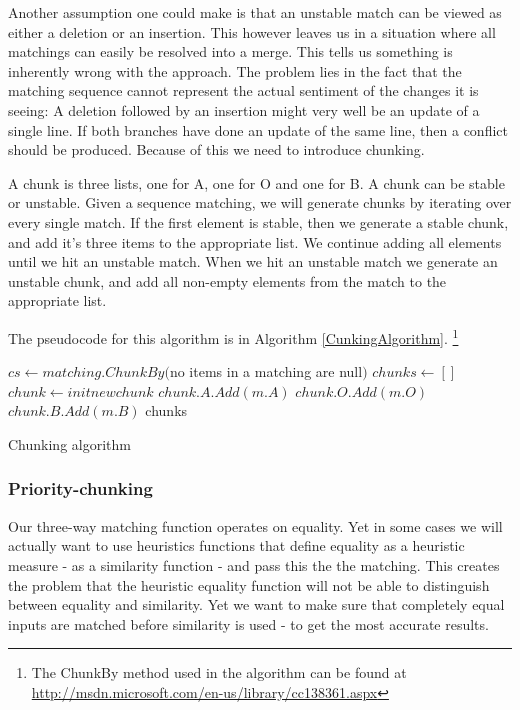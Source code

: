 \documentclass[11pt]{article}
\begin{document}
Another assumption one could make is that an unstable match can be viewed as either a deletion or an insertion. This however leaves us in a situation where all matchings can easily be resolved into a merge. This tells us something is inherently wrong with the approach. The problem lies in the fact that the matching sequence cannot represent the actual sentiment of the changes it is seeing: A deletion followed by an insertion might very well be an update of a single line. If both branches have done an update of the same line, then a conflict should be produced. Because of this we need to introduce chunking.

A chunk is three lists, one for A, one for O and one for B. A chunk can be stable or unstable. Given a sequence matching, we will generate chunks by iterating over every single match. If the first element is stable, then we generate a stable chunk, and add it's three items to the appropriate list. We continue adding all elements until we hit an unstable match. When we hit an unstable match we generate an unstable chunk, and add all non-empty elements from the match to the appropriate list.

The pseudocode for this algorithm is in Algorithm \ref{CunkingAlgorithm}. \footnote{The ChunkBy method used in the algorithm can be found at \url{http://msdn.microsoft.com/en-us/library/cc138361.aspx}}


\begin{algorithm}
\begin{algorithmic}
	\State $cs \gets matching.ChunkBy($no items in a matching are null$)$
	\State $chunks \gets []$
		\State $chunk \gets init new chunk$
				\State $chunk.A.Add(m.A)$
			\EndIf
				\State $chunk.O.Add(m.O)$
			\EndIf
				\State $chunk.B.Add(m.B)$
			\EndIf
		\EndFor
	\EndFor
	\State \Return chunks
\EndFunction
\end{algorithmic}
\caption{Chunking algorithm}
  \label{CunkingAlgorithm}
\end{algorithm}


\subsubsection{Priority-chunking}
\label{PriorityDiff}
Our three-way matching function operates on equality. Yet in some cases we will actually want to use heuristics functions that define equality as a heuristic measure - as a similarity function - and pass this the the matching. This creates the problem that the heuristic equality function will not be able to distinguish between equality and similarity. Yet we want to make sure that completely equal inputs are matched before similarity is used - to get the most accurate results.
\end{document}

